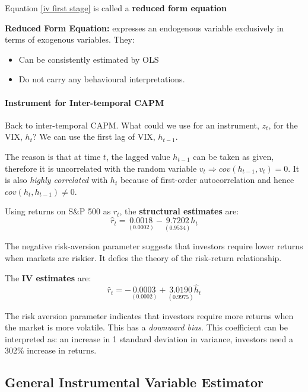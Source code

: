 \documentclass[11pt]{article}
\begin{document}
Equation \eqref{iv first stage} is called a \textbf{reduced form equation}

\begin{definition}
    \textbf{Reduced Form Equation:} expresses an endogenous variable exclusively in terms of exogenous variables. 
    They:
    \begin{itemize}
        \item Can be consistently estimated by OLS
        \item Do not carry any behavioural interpretations.
    \end{itemize}
\end{definition}

\newpage

\begin{example}
\item
\paragraph{Instrument for Inter-temporal CAPM} \mbox{}

Back to inter-temporal CAPM. What could we use for an instrument, $z_t$, for the VIX, $h_t$? We can use the first lag of VIX, $h_{t-1}$.

The reason is that at time $t$, the lagged value $h_{t-1}$ can be taken as given, therefore it is uncorrelated with the random variable $v_t \Rightarrow cov(h_{t-1}, v_t)=0$. It is also \textit{highly correlated} with $h_t$ because of first-order autocorrelation and hence $cov(h_t, h_{t-1}) \neq 0.$

Using returns on S\&P 500 as $r_t$, the \textbf{structural estimates} are:
\[\hat{r}_t = \underset{(0.0002)}{0.0018} - \underset{(0.9534)}{9.7202}h_t\]

The negative risk-aversion parameter suggests that investors require lower returns when markets are riskier. It defies the theory of the risk-return relationship.

The \textbf{IV estimates} are:
\[\hat{r}_t = -\underset{(0.0002)}{0.0003} + \underset{(0.9975)}{3.0190}\hat{h}_t\]

The risk aversion parameter indicates that investors require more returns when the market is more volatile. This has a \textit{downward bias}. This coefficient can be interpreted as: an increase in 1 standard deviation in variance, investors need a 302\% increase in returns.
\end{example}

\subsection{General Instrumental Variable Estimator}
\end{document}
